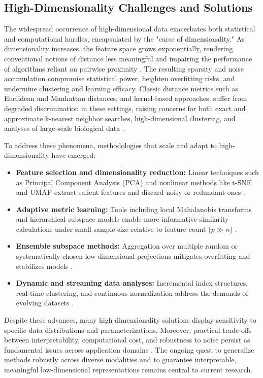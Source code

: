 \subsection{High-Dimensionality Challenges and Solutions}

The widespread occurrence of high-dimensional data exacerbates both statistical and computational hurdles, encapsulated by the "curse of dimensionality." As dimensionality increases, the feature space grows exponentially, rendering conventional notions of distance less meaningful and impairing the performance of algorithms reliant on pairwise proximity \cite{ref64,ref65}. The resulting sparsity and noise accumulation compromise statistical power, heighten overfitting risks, and undermine clustering and learning efficacy. Classic distance metrics such as Euclidean and Manhattan distances, and kernel-based approaches, suffer from degraded discrimination in these settings, raising concerns for both exact and approximate k-nearest neighbor searches, high-dimensional clustering, and analyses of large-scale biological data \cite{ref72,ref73,ref93,ref110,ref116}.

To address these phenomena, methodologies that scale and adapt to high-dimensionality have emerged:

\begin{itemize}
    \item \textbf{Feature selection and dimensionality reduction:} Linear techniques such as Principal Component Analysis (PCA) and nonlinear methods like t-SNE and UMAP extract salient features and discard noisy or redundant ones \cite{ref92,ref97,ref101}.
    \item \textbf{Adaptive metric learning:} Tools including local Mahalanobis transforms and hierarchical subspace models enable more informative similarity calculations under small sample size relative to feature count (\(p \gg n\)) \cite{ref64,ref92,ref93}.
    \item \textbf{Ensemble subspace methods:} Aggregation over multiple random or systematically chosen low-dimensional projections mitigates overfitting and stabilizes models \cite{ref116}.
    \item \textbf{Dynamic and streaming data analyses:} Incremental index structures, real-time clustering, and continuous normalization address the demands of evolving datasets \cite{ref76,ref79,ref80,ref94}.
\end{itemize}

Despite these advances, many high-dimensionality solutions display sensitivity to specific data distributions and parameterizations. Moreover, practical trade-offs between interpretability, computational cost, and robustness to noise persist as fundamental issues across application domains \cite{ref91,ref94,ref95}. The ongoing quest to generalize methods robustly across diverse modalities and to guarantee interpretable, meaningful low-dimensional representations remains central to current research.

